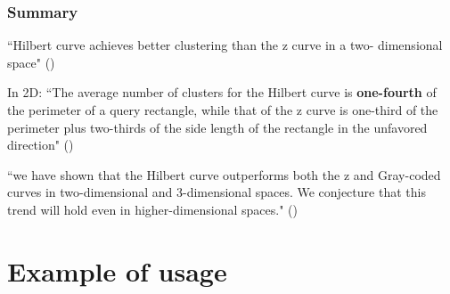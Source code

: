 \documentclass[slidestop,compress,red,mathserif]{beamer}
\begin{document}

\begin{frame}
 \frametitle{Summary}


      ``Hilbert curve achieves
      better clustering than the z curve in a two-
      dimensional space" (\cite{908985}) \par

      In 2D: ``The average number of clusters
      for the Hilbert curve is \textbf{one-fourth} of the perimeter
      of a query rectangle, while that of the z curve is
      one-third of the perimeter plus two-thirds of the
      side length of the rectangle in the unfavored
      direction" (\cite{908985}) \par

      ``we have shown that the Hilbert curve
      outperforms both the z and Gray-coded curves in
      two-dimensional and 3-dimensional spaces. We
      conjecture that this trend will hold even in higher-dimensional spaces." (\cite{908985})


\end{frame}


\section{Example of usage}

\end{document}
